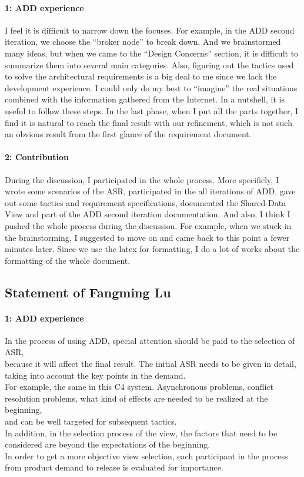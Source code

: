 \documentclass{article}
\begin{document}
	\paragraph{1: ADD experience}
	I feel it is difficult to narrow down the focuses. For example, in the ADD second iteration, we choose the “broker node” to break down. And we brainstormed many ideas, but when we came to the “Design Concerns” section, it is difficult to summarize them into several main categories.
Also, figuring out the tactics used to solve the architectural requirements is a big deal to me since we lack the development experience. I could only do my best to “imagine” the real situations combined with the information gathered from the Internet.
In a nutshell, it is useful to follow these steps. In the last phase, when I put all the parts together, I find it is natural to reach the final result with our refinement, which is not such an obvious result from the first glance of the requirement document.
	\paragraph{2: Contribution}
	During the discussion, I participated in the whole process.
	More specificly, I wrote some scenarios of the ASR, participated in the all iterations of ADD, gave out some tactics and requirement specifications, documented the Shared-Data View and part of the ADD second iteration documentation.
	And also, I think I pushed the whole process during the discussion. For example, when we stuck in the brainstorming, I suggested to move on and came back to this point a fewer minutes later. 
	Since we use the latex for formatting, I do a lot of works about the formatting of the whole document.

	\subsection{Statement of Fangming Lu}
	\paragraph{1: ADD experience}
		In the process of using ADD, special attention should be paid to the selection of ASR, \\
	because it will affect the final result. The initial ASR needs to be given in detail, taking into account the key points in the demand. \\
	For example, the same in this C4 system. Asynchronous problems, conflict resolution problems, what kind of effects are needed to be realized at the beginning, \\
	and can be well targeted for subsequent tactics.\\
	In addition, in the selection process of the view, the factors that need to be considered are beyond the expectations of the beginning. \\
	In order to get a more objective view selection, each participant in the process from product demand to release is evaluated for importance.\\
\end{document}
